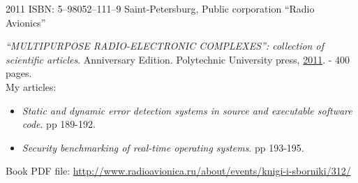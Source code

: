 

\begin{entrylist}
    \entry
    {2011}
    {ISBN: 5–98052–111–9}
    {Saint-Petersburg, Public corporation \enquote{Radio Avionics}}
    {\textit{\enquote{MULTIPURPOSE RADIO-ELECTRONIC COMPLEXES}: collection of scientific articles}. Anniversary Edition. Polytechnic University press, \underline{2011}. - 400 pages.\\
    My articles:
    \begin{itemize}
    	\setlength\itemsep{0em}
        \item \textit{Static and dynamic error detection systems in source and executable software code}. pp 189-192.
        \item \textit{Security benchmarking of real-time operating systems}. pp 193-195.
    \end{itemize}
        Book PDF file: \url{http://www.radioavionica.ru/about/events/knigi-i-sborniki/312/}
    }
\end{entrylist}
